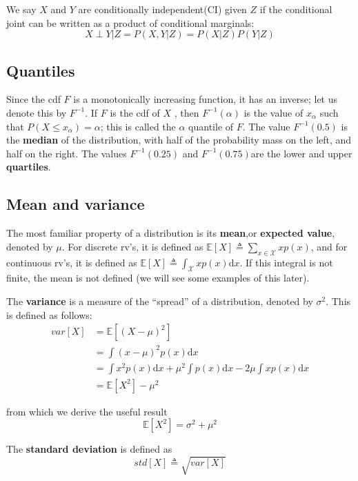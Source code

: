 \documentclass[graybox, envcountchap, twocolumn]{styles/svmult}
\begin{document}
We say $X$ and $Y$ are conditionally independent(CI) given $Z$ if the conditional joint can be written as a product of conditional marginals:
\begin{equation}
X \perp Y|Z=P(X,Y|Z)=P(X|Z)P(Y|Z)
\end{equation}

\subsection{Quantiles}
Since the cdf $F$ is a monotonically increasing function, it has an inverse; let us denote this by $F^{-1}$. If $F$ is the cdf of $X$ , then $F^{-1}(\alpha)$ is the value of $x_{\alpha}$ such that $P(X \leq x_{\alpha})=\alpha$; this is called the $\alpha$ quantile of $F$. The value $F^{-1}(0.5)$ is the \textbf{median} of the distribution, with half of the probability mass on the left, and half on the right. The values $F^{-1}(0.25)$ and $F^{−1}(0.75)$are the lower and upper \textbf{quartiles}.

\subsection{Mean and variance}
The most familiar property of a distribution is its \textbf{mean},or \textbf{expected value}, denoted by $\mu$. For discrete rv’s, it is defined as $\mathbb{E}[X] \triangleq \sum_{x \in \mathcal{X}}xp(x)$, and for continuous rv’s, it is defined as $\mathbb{E}[X] \triangleq \int_{\mathcal{X}}xp(x)\mathrm{d}x$. If this integral is not finite, the mean is not defined (we will see some examples of this later). 

The \textbf{variance} is a measure of the “spread” of a distribution, denoted by $\sigma^2$. This is defined as follows:
\begin{align}
var[X]& =\mathbb{E}[(X-\mu)^2] \\
      & =\int{(x-\mu)^2p(x)\mathrm{d}x} \nonumber \\
      & =\int{x^2p(x)\mathrm{d}x}+{\mu}^2\int{p(x)\mathrm{d}x}-2\mu\int{xp(x)\mathrm{d}x} \nonumber \\
	  & =\mathbb{E}[X^2]-{\mu}^2
\end{align}

from which we derive the useful result
\begin{equation}
\mathbb{E}[X^2]=\sigma^2+{\mu}^2
\end{equation}

The \textbf{standard deviation} is defined as
\begin{equation}
std[X] \triangleq \sqrt{var[X]}
\end{equation}
\end{document}

